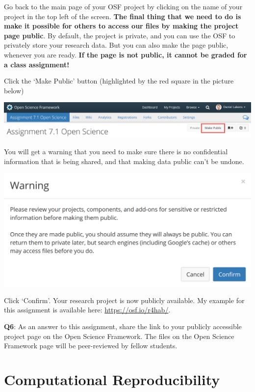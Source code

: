 \documentclass[
  oneside]{krantz}
\begin{document}
Go back to the main page of your OSF project by clicking on the name of your project in the top left of the screen. \textbf{The final thing that we need to do is make it possible for others to access our files by making the project page public}. By default, the project is private, and you can use the OSF to privately store your research data. But you can also make the page public, whenever you are ready. \textbf{If the page is not public, it cannot be graded for a class assignment!}

Click the `Make Public' button (highlighted by the red square in the picture below)

\begin{center}\includegraphics[width=1\linewidth]{images/791bc1160787ae06a961761fb260b687} \end{center}

You will get a warning that you need to make sure there is no confidential information that is being shared, and that making data public can't be undone.

\begin{center}\includegraphics[width=1\linewidth]{images/ae3d492ab7249bafc5969ba8345d58ca} \end{center}

Click `Confirm'. Your research project is now publicly available. My example for this assignment is available here: \url{https://osf.io/r4hab/}.

\textbf{Q6}: As an answer to this assignment, share the link to your publicly accessible project page on the Open Science Framework. The files on the Open Science Framework page will be peer-reviewed by fellow students.

\hypertarget{computationalreproducibility}{%
\chapter{Computational Reproducibility}\label{computationalreproducibility}}
\end{document}
